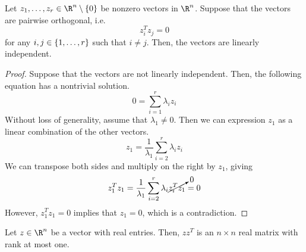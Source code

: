 \documentclass[11pt,letterpaper]{article}
\begin{document}
\begin{prop}
    Let $z_1, \ldots, z_r \in \R^n \setminus \setof{0}$ be nonzero vectors in
    $\R^n$. Suppose that the vectors are pairwise orthogonal, i.e.
    \begin{equation*}
        z_i^T z_j = 0
    \end{equation*}
    for any $i, j \in \left\{1,\ldots,r\right\}$ such that $i \neq j$.
    Then, the vectors are linearly independent.
\end{prop}

\begin{proof}
    Suppose that the vectors are not linearly independent.
    Then, the following equation has a nontrivial solution.
    \begin{equation*}
        0 = \sum_{i=1}^r {\lambda_i z_i}
    \end{equation*}
    Without loss of generality, assume that $\lambda_1 \neq 0$.
    Then we can expression $z_1$ as a linear combination of the other vectors.
    \begin{equation*}
        z_1 = \frac{1}{\lambda_1} \sum_{i=2}^r {\lambda_i z_i}
    \end{equation*}
    We can transpose both sides and multiply on the right by $z_1$, giving
    \begin{equation*}
        z_1^T z_1
        = \frac{1}{\lambda_1} \sum_{i=2}^r {\lambda_i \cancelto{0}{z_i^T z_1}}
        = 0
    \end{equation*}
    However, $z_1^T z_1 = 0$ implies that $z_1 = 0$, which is a contradiction.
\end{proof}

\begin{prop}
    Let $z \in \R^n$ be a vector with real entries.
    Then, $z z^T$ is an $n \times n$ real matrix with rank at most one.
\end{prop}
\end{document}
